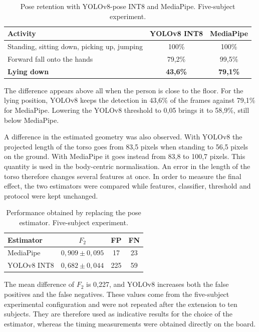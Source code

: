 \begin{table}[htbp]
\centering
\caption{Pose retention with YOLOv8-pose INT8 and MediaPipe. Five-subject experiment.} \label{tab:ritenzione}
\begin{tabular}{lcc}
\toprule
\textbf{Activity} & \textbf{YOLOv8 INT8} & \textbf{MediaPipe} \\
\midrule Standing, sitting down, picking up, jumping & 100\% & 100\% \\
Forward fall onto the hands & 79,2\% & 99,5\% \\
\textbf{Lying down} & \textbf{43,6\%} & \textbf{79,1\%} \\
\bottomrule
\end{tabular}
\end{table}

The difference appears above all when the person is close to the floor. For the lying position, YOLOv8 keeps the detection in 43,6\% of the frames against 79,1\% for MediaPipe. Lowering the YOLOv8 threshold to 0,05 brings it to 58,9\%, still below MediaPipe.

A difference in the estimated geometry was also observed. With YOLOv8 the projected length of the torso goes from 83,5 pixels when standing to 56,5 pixels on the ground. With MediaPipe it goes instead from 83,8 to 100,7 pixels. This quantity is used in the body-centric normalisation. An error in the length of the torso therefore changes several features at once. In order to measure the final effect, the two estimators were compared while features, classifier, threshold and protocol were kept unchanged.

\begin{table}[H]
\centering
\caption{Performance obtained by replacing the pose estimator. Five-subject experiment.}
\label{tab:stimatori_f2}
\begin{tabular}{lccc}
\toprule
\textbf{Estimator} & \textbf{$F_2$} & \textbf{FP} & \textbf{FN} \\
\midrule MediaPipe & $0{,}909 \pm 0{,}095$ & 17 & 23 \\
YOLOv8 INT8 & $0{,}682 \pm 0{,}044$ & 225 & 59 \\
\bottomrule
\end{tabular}
\end{table}

The mean difference of $F_2$ is 0,227, and YOLOv8 increases both the false positives and the false negatives. These values come from the five-subject experimental configuration and were not repeated after the extension to ten subjects. They are therefore used as indicative results for the choice of the estimator, whereas the timing measurements were obtained directly on the board.

